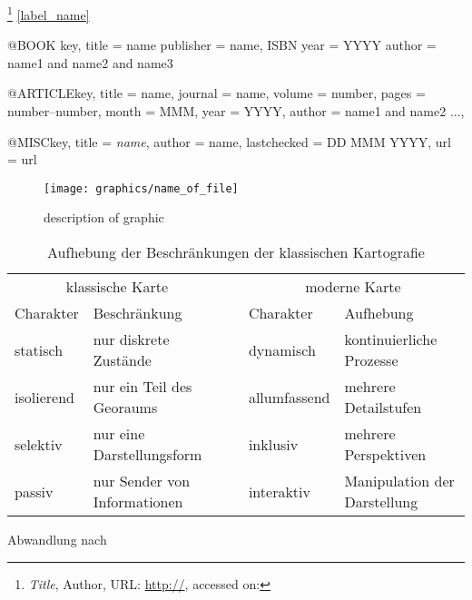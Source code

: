 \footnote{
  \textit{Title},
  Author,
  URL: \url{http://},
  accessed on:
}
\cite{source_id}    %
\ref{label_name}    %

@BOOK {key,
  title = {{name}}
  publisher = {name, ISBN}
  year = {YYYY}
  author = {name1 and name2 and name3}
}

@ARTICLE{key,
  title = {{name}},
  journal = {name},
  volume = {number},
  pages = {number--number},
  month = {MMM},
  year = {YYYY},
  author = {name1 and name2 ...},
}

@MISC{key,
  title       = {\emph{name}},
  author      = {{name}},
  lastchecked = {DD MMM YYYY},
  url         = {url}
}

\begin{figure}[ht]  %
    \begin{center}
        \texttt{[image: graphics/name\_of\_file]}
    \end{center}
    \caption{description of graphic}
    \label{fig:graphics_name}
\end{figure}

\begin{table}[ht]
\centering
\begin{tabular}{llp{1em}ll}
    \toprule
    \multicolumn{2}{c}{klassische Karte} & & \multicolumn{2}{c}{moderne Karte} \\
    Charakter & Beschränkung & & Charakter & Aufhebung \\
    \midrule
    statisch & nur diskrete Zustände & & dynamisch & kontinuierliche Prozesse \\
    isolierend & nur ein Teil des Georaums & & allumfassend & mehrere Detailstufen \\
    selektiv & nur eine Darstellungsform & & inklusiv & mehrere Perspektiven \\
    passiv & nur Sender von Informationen & & interaktiv & Manipulation der Darstellung \\
    \bottomrule
\end{tabular}
\caption{Aufhebung der Beschränkungen der klassischen Kartografie}
\label{tab:kartografie}
{\small Abwandlung nach \cite{karcher}}
\end{table}


\vspace{-1em}       %
\newpage            %

